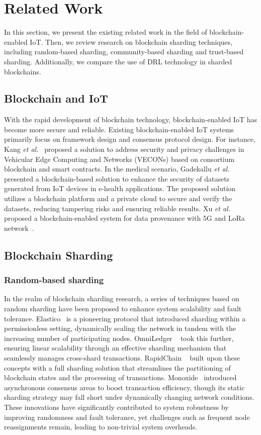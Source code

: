 
\section{Related Work}
\label{section: related work}
In this section, we present the existing related work in the field of blockchain-enabled IoT. Then, we review research on blockchain sharding techniques, including random-based sharding, community-based sharding and trust-based sharding. Additionally, we compare the use of DRL technology in sharded blockchains.

\subsection{Blockchain and IoT}
With the rapid development of blockchain technology, blockchain-enabled IoT has become more secure and reliable. Existing blockchain-enabled IoT systems primarily focus on framework design and consensus protocol design. For instance, Kang \textit{et al.}~\cite{kang2018blockchain} proposed a solution to address security and privacy challenges in Vehicular Edge Computing and Networks (VECONs) based on consortium blockchain and smart contracts. In the medical scenario, Gadekallu \textit{et al.}~\cite{gadekallu2021blockchain} presented a blockchain-based solution to enhance the security of datasets generated from IoT devices in e-health applications. The proposed solution utilizes a blockchain platform and a private cloud to secure and verify the datasets, reducing tampering risks and ensuring reliable results. 
Xu \textit{et al.} proposed a blockchain-enabled system for data provenance with 5G and LoRa network~\cite{9526860,YU2021102492}.


\subsection{Blockchain Sharding}

\subsubsection{Random-based sharding}
In the realm of blockchain sharding research, a series of techniques based on random sharding have been proposed to enhance system scalability and fault tolerance. Elastico~\cite{luu2016secure} is a pioneering protocol that introduced sharding within a permissionless setting, dynamically scaling the network in tandem with the increasing number of participating nodes. OmniLedger ~\cite{kokoris2018omniledger} took this further, ensuring linear scalability through an effective sharding mechanism that seamlessly manages cross-shard transactions. RapidChain ~\cite{zamani2018rapidchain} built upon these concepts with a full sharding solution that streamlines the partitioning of blockchain states and the processing of transactions. Monoxide~\cite{wang2019monoxide} introduced asynchronous consensus areas to boost transaction efficiency, though its static sharding strategy may fall short under dynamically changing network conditions. These innovations have significantly contributed to system robustness by improving randomness and fault tolerance, yet challenges such as frequent node reassignments remain, leading to non-trivial system overheads.


